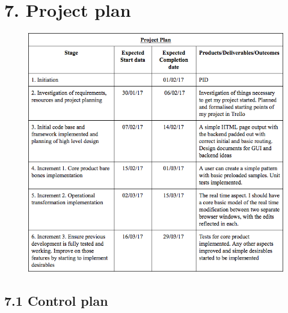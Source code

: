 \documentclass[a4paper]{article}
\begin{document}
\section{7. Project plan}

\begin{figure}

    \includegraphics[width=\linewidth]{img/project-plan-table.png}

\end{figure}

\subsection{7.1 Control plan}
\end{document}
